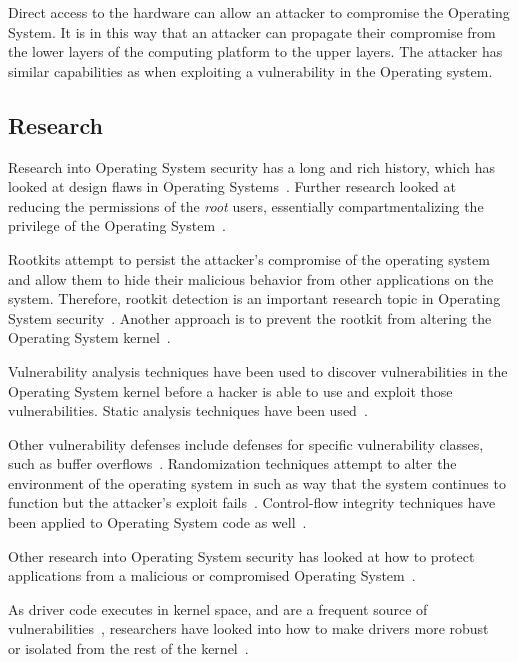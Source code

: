 \documentclass[11pt,letterpaper]{article}
\begin{document}
Direct access to the hardware can allow an attacker to compromise the
Operating System. It is in this way that an attacker can propagate
their compromise from the lower layers of the computing platform to
the upper layers. The attacker has similar capabilities as when
exploiting a vulnerability in the Operating system.

\subsection{Research}

Research into Operating System security has a long and rich history,
which has looked at design flaws in Operating
Systems~\cite{Attanasio1973}. Further research looked at reducing the
permissions of the \emph{root} users, essentially compartmentalizing
the privilege of the Operating System~\cite{Kamp2000, Kurmus2014a}.

Rootkits attempt to persist the attacker's compromise of the operating
system and allow them to hide their malicious behavior from other
applications on the system. Therefore, rootkit detection is an
important research topic in Operating System
security~\cite{Petroni2004, Wang2005, Petroni2007, Payne2008,
  Sharif2009, Yin2010, Bianchi2012}. Another approach is to prevent
the rootkit from altering the Operating System
kernel~\cite{Riley2008a, Wang2009, Grace2010, Gadaleta2011}.

Vulnerability analysis techniques have been used to discover
vulnerabilities in the Operating System kernel before a hacker is able
to use and exploit those vulnerabilities. Static analysis techniques
have been used~\cite{Chou2001, Chen2011}.

Other vulnerability defenses include defenses for specific
vulnerability classes, such as buffer overflows~\cite{Dalton2008}.
Randomization techniques attempt to alter the environment of the
operating system in such as way that the system continues to function
but the attacker's exploit fails~\cite{Lin2009, Giuffrida2012}.
Control-flow integrity techniques have been applied to Operating
System code as well~\cite{Li2011a}.

Other research into Operating System security has looked at how to
protect applications from a malicious or compromised Operating
System~\cite{Ta-min2006, Onarlioglu2013, Li2014}.

As driver code executes in kernel space, and are a frequent source of
vulnerabilities~\cite{Kadav2012}, researchers have looked into how to
make drivers more robust~\cite{Ganapathy2008, Hruby2012} or isolated
from the rest of the kernel~\cite{Boyd-Wickizer2010}.
\end{document}
